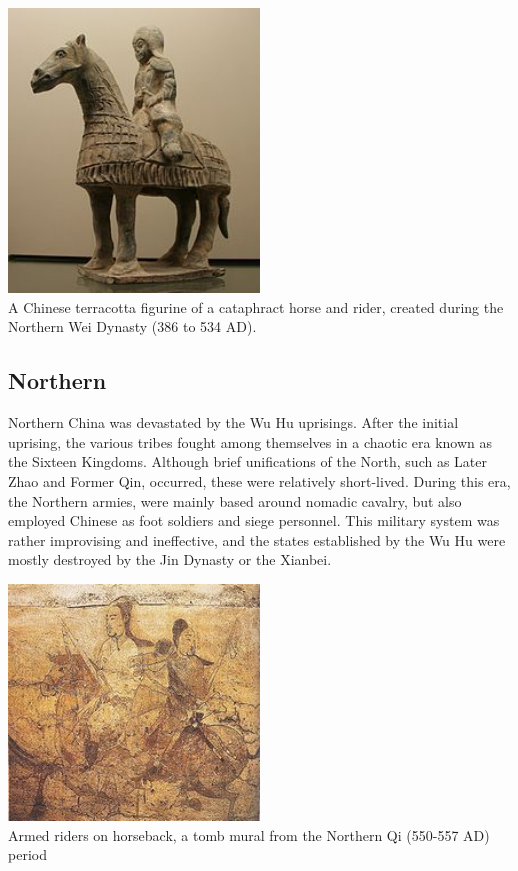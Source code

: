 \documentclass[compress]{beamer}
\begin{document}
\begin{frame}
\begin{center}
\includegraphics[width = 0.50\textwidth]{military-en/f.jpg} \\
A Chinese terracotta figurine of a cataphract horse and rider, created during the Northern Wei Dynasty (386 to 534 AD).
\end{center}
\end{frame}

\begin{frame}
\subsection{Northern}
Northern China was devastated by the Wu Hu uprisings. After the initial uprising, the various tribes fought among themselves in a chaotic era known as the Sixteen Kingdoms. Although brief unifications of the North, such as Later Zhao and Former Qin, occurred, these were relatively short-lived. During this era, the Northern armies, were mainly based around nomadic cavalry, but also employed Chinese as foot soldiers and siege personnel. This military system was rather improvising and ineffective, and the states established by the Wu Hu were mostly destroyed by the Jin Dynasty or the Xianbei.
\end{frame}

\begin{frame}
\begin{center}
\includegraphics[width = 0.50\textwidth]{military-en/g.jpg} \\
Armed riders on horseback, a tomb mural from the Northern Qi (550-557 AD) period
\end{center}
\end{frame}
\end{document}
